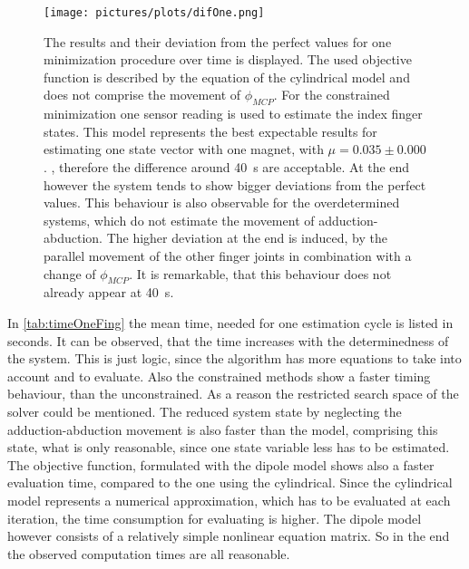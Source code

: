 \begin{figure}
\centering
\texttt{[image: pictures/plots/difOne.png]}
\caption[Estimated states vs. perfect states for using one magnet, one sensor.]
{The results and their deviation from the perfect values for one minimization procedure over time is displayed. The used objective function is described by the equation of the cylindrical model and does not comprise the movement of $ \phi_{MCP} $. For the constrained minimization one sensor reading is used to estimate the index finger states. This model represents the best expectable results for estimating one state vector with one magnet, with $ \mu = 0.035 \pm 0.000 $. , therefore the difference around \SI{40}{\second} are acceptable. At the end however the system tends to show bigger deviations from the perfect values. This behaviour is also observable for the overdetermined systems, which do not estimate the movement of adduction-abduction. The higher deviation at the end is induced, by the parallel movement of the other finger joints in combination with a change of $ \phi_{MCP} $. It is remarkable, that this behaviour does not already appear at \SI{40}{\second}.  }
\label{fig:11cylNa1}
\end{figure}
In \ref{tab:timeOneFing} the mean time, needed for one estimation cycle is listed in seconds. It can be observed, that the time increases with the determinedness of the system. This is just logic, since the algorithm has more equations to take into account and to evaluate. Also the constrained methods show a faster timing behaviour, than the unconstrained. As a reason the restricted search space of the solver could be mentioned. The reduced system state by neglecting the adduction-abduction movement is also faster than the model, comprising this state, what is only reasonable, since one state variable less has to be estimated. The objective function, formulated with the dipole model shows also a faster evaluation time, compared to the one using the cylindrical. Since the cylindrical model represents a numerical approximation, which has to be evaluated at each iteration, the time consumption for evaluating is higher. The dipole model however consists of a relatively simple nonlinear equation matrix. So in the end the observed computation times are all reasonable. 
